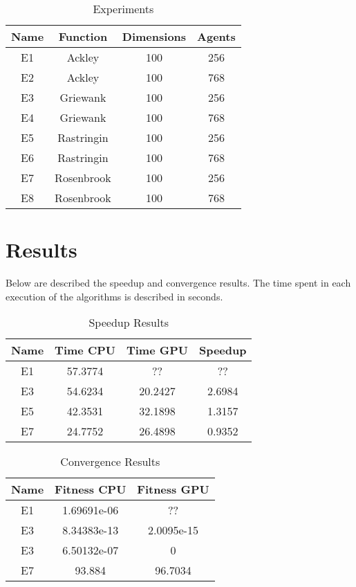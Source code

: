 \documentclass[conference]{IEEEtran}
\begin{document}
\begin{table}[!htbp]
    \renewcommand{\arraystretch}{1.3}
    \caption{Experiments}
    \label{experiments}
    \centering
    \begin{tabular}{c|c|c|c}
    \hline
        \bf Name & Function &  Dimensions & Agents\\
    \hline
        E1 & Ackley & 100 & 256\\
        E2 & Ackley & 100 & 768\\
        E3 & Griewank & 100 & 256\\
        E4 & Griewank & 100 & 768\\
        E5 & Rastringin & 100 & 256\\
        E6 & Rastringin & 100 & 768\\
        E7 & Rosenbrook & 100 & 256\\
        E8 & Rosenbrook & 100 & 768\\
    \end{tabular}
\end{table}

\section{Results}

Below are described the speedup and convergence results. The time spent in each execution of the algorithms is described in seconds.

\begin{table}[!t]
    \renewcommand{\arraystretch}{1.3}
    \caption{Speedup Results}
    \label{results}
    \centering
    \begin{tabular}{c|c|c|c}
    \hline
        \bf Name & Time CPU & Time GPU & Speedup\\
    \hline
        E1 & 57.3774 & ?? & ?? \\
        E3 & 54.6234 & 20.2427 & 2.6984 \\
        E5 & 42.3531 & 32.1898 & 1.3157 \\
        E7 & 24.7752 & 26.4898 & 0.9352 \\
    \end{tabular}
\end{table}

\begin{table}[!t]
    \renewcommand{\arraystretch}{1.3}
    \caption{Convergence Results}
    \label{results}
    \centering
    \begin{tabular}{c|c|c}
    \hline
        \bf Name & Fitness CPU & Fitness GPU \\
    \hline
        E1 & 1.69691e-06 & ?? \\
        E3 & 8.34383e-13 &  2.0095e-15  \\
        E3 & 6.50132e-07 & 0 \\
        E7 & 93.884 & 96.7034 & \\
    \end{tabular}
\end{table}
\end{document}
